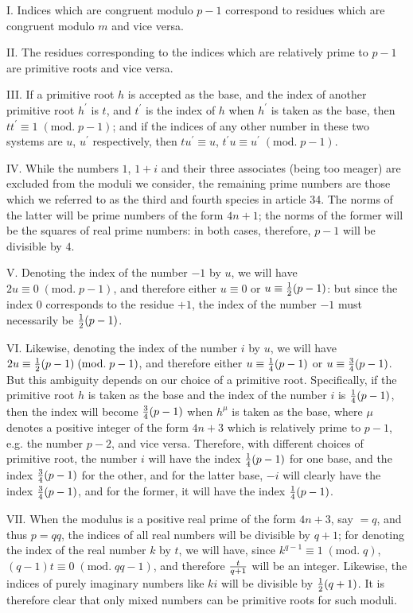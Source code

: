 \documentclass[twoside,12pt]{memoir}
\renewcommand{\pmod}[1]{\;(\textrm{mod.}\;#1)}
\let\oldfrac\frac
\def\frac#1#2{\mathchoice{\tfrac{#1}{#2}}{\oldfrac{#1}{#2}}{\genfrac{}{}{}{2}{#1}{#2\mathstrut}}{\genfrac{}{}{}{3}{#1}{#2\mathstrut}}}
\begin{document}
I. Indices which are congruent modulo \(p-1\) correspond to residues which are congruent modulo \(m\) and vice versa.

II. The residues corresponding to the indices which are relatively prime to \(p-1\) are primitive roots and vice versa.

III. If a primitive root \(h\) is accepted as the base, and the index of another primitive root \(h^{\prime}\) is \(t\), and \(t^{\prime}\) is the index of \(h\) when \(h^{\prime}\) is taken as the base, then \(t t^{\prime} \equiv 1\pmod{p-1}\); and if the  indices of any other number in these two systems are \(u\), \(u^{\prime}\) respectively, then \(t u^{\prime} \equiv u\), \(t^{\prime} u \equiv u^{\prime}\pmod{p-1}\).

IV. While the numbers \(1\), \(1+i\) and their three associates (being too meager) are excluded from the moduli we consider, the remaining prime numbers are those which we referred to as the third and fourth species in article 34. The norms of the latter will be prime numbers of the form \(4n+1\); the norms of the former will be the squares of real prime numbers: in both cases, therefore, \(p-1\) will be divisible by \(4\).

V. Denoting the index of the number \(-1\) by \(u\), we will have \(2 u \equiv 0\pmod{p-1}\), and therefore either \(u \equiv 0\) or \(u \equiv \frac{1}{2}(p-1)\): but since the index \(0\) corresponds to the residue \(+1\), the index of the number \(-1\) must necessarily be \(\frac{1}{2}(p-1)\).

VI. Likewise, denoting the index of the number \(i\) by \(u\), we will have \(2 u \equiv \frac{1}{2}(p-1) \pmod{p-1}\), and therefore either \(u \equiv \frac{1}{4}(p-1)\) or \(u \equiv \frac{3}{4}(p-1)\). But this ambiguity depends on our choice of a primitive root. Specifically, if the primitive root \(h\) is taken as \pagebreak%
the base and the index of the number \(i\) is \(\frac{1}{4}(p-1)\), then the index will become \(\frac{3}{4}(p-1)\) when \(h^{\mu}\) is taken as the base, where \(\mu\) denotes a positive integer of the form \(4 n+3\) which is relatively prime to \(p-1\), e.g. the number \(p-2\), and vice versa. Therefore, with different choices of primitive root, the number \(i\) will have the index \(\frac{1}{4}(p-1)\) for one base, and the index \(\frac{3}{4}(p-1)\) for the other, and for the latter base, \(-i\) will clearly have the index \(\frac{3}{4}(p-1)\), and for the former, it will have the index \(\frac{1}{4}(p-1)\).

\(\text{VII.}\) When the modulus is a positive real prime of the form \(4 n+3\), say \(=q\), and thus \(p=q q\), the indices of all real numbers will be divisible by \(q+1\); for denoting the index of the real number \(k\) by \(t\), we will have, since \(k^{q-1} \equiv 1\pmod{q}\), \((q-1) t \equiv 0\pmod{q q-1}\), and therefore \(\frac{t}{q+1}\) will be an integer. Likewise, the indices of purely imaginary numbers like \(ki\) will be divisible by \(\frac{1}{2}(q+1)\). It is therefore clear that only mixed numbers can be primitive roots for such moduli.
\end{document}
